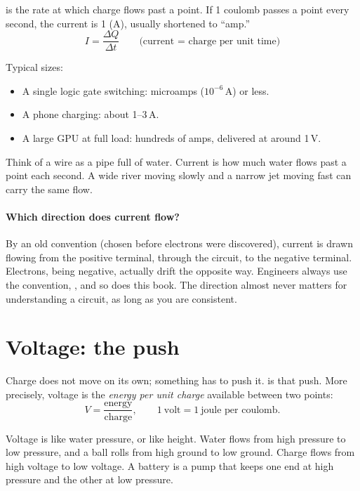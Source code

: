  is the rate at which charge flows past a point. If 1 coulomb passes a point every second, the current is 1  (A), usually shortened to ``amp.''
\[
  I = \frac{\Delta Q}{\Delta t} \qquad \text{(current = charge per unit time)}
\]

Typical sizes:
\begin{itemize}
  \item A single logic gate switching: microamps ($10^{-6}$\,A) or less.
  \item A phone charging: about 1--3\,A.
  \item A large GPU at full load: hundreds of amps, delivered at around 1\,V.
\end{itemize}

\begin{everyday}
Think of a wire as a pipe full of water. Current is how much water flows past a point each second. A wide river moving slowly and a narrow jet moving fast can carry the same flow.
\end{everyday}

\paragraph{Which direction does current flow?} By an old convention (chosen before electrons were discovered), current is drawn flowing from the positive terminal, through the circuit, to the negative terminal. Electrons, being negative, actually drift the opposite way. Engineers always use the convention, , and so does this book. The direction almost never matters for understanding a circuit, as long as you are consistent.

\section{Voltage: the push}

Charge does not move on its own; something has to push it.  is that push. More precisely, voltage is the \emph{energy per unit charge} available between two points:
\[
  V = \frac{\text{energy}}{\text{charge}}, \qquad 1~\text{volt} = 1~\text{joule per coulomb}.
\]

\begin{everyday}
Voltage is like water pressure, or like height. Water flows from high pressure to low pressure, and a ball rolls from high ground to low ground. Charge flows from high voltage to low voltage. A battery is a pump that keeps one end at high pressure and the other at low pressure.
\end{everyday}

